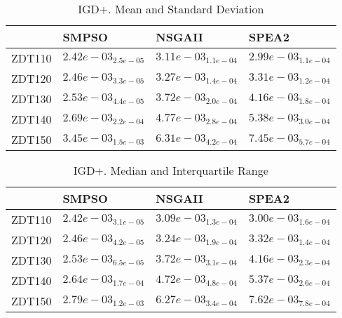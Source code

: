 \documentclass{article}
\begin{document}
\begin{table}
\caption{IGD+. Mean and Standard Deviation}
\label{table: IGD+}
\centering
\begin{scriptsize}
\begin{tabular}{llll}
\hline & SMPSO & NSGAII &  SPEA2\\
\hline 
ZDT110 & \cellcolor{gray95}$  2.42e-03_{ 2.5e-05}$ & $  3.11e-03_{ 1.1e-04}$ & \cellcolor{gray25}$  2.99e-03_{ 1.1e-04}$ \\
ZDT120 & \cellcolor{gray95}$  2.46e-03_{ 3.3e-05}$ & \cellcolor{gray25}$  3.27e-03_{ 1.4e-04}$ & $  3.31e-03_{ 1.2e-04}$ \\
ZDT130 & \cellcolor{gray95}$  2.53e-03_{ 4.4e-05}$ & \cellcolor{gray25}$  3.72e-03_{ 2.0e-04}$ & $  4.16e-03_{ 1.8e-04}$ \\
ZDT140 & \cellcolor{gray95}$  2.69e-03_{ 2.2e-04}$ & \cellcolor{gray25}$  4.77e-03_{ 2.8e-04}$ & $  5.38e-03_{ 3.0e-04}$ \\
ZDT150 & \cellcolor{gray95}$  3.45e-03_{ 1.5e-03}$ & \cellcolor{gray25}$  6.31e-03_{ 4.2e-04}$ & $  7.45e-03_{ 5.7e-04}$ \\
\hline
\end{tabular}
\end{scriptsize}
\end{table}

\begin{table}
\caption{IGD+. Median and Interquartile Range}
\label{table: IGD+}
\centering
\begin{scriptsize}
\begin{tabular}{llll}
\hline & SMPSO & NSGAII &  SPEA2\\
\hline 
ZDT110 & \cellcolor{gray95}$  2.42e-03_{ 3.1e-05}$ & $  3.09e-03_{ 1.3e-04}$ & \cellcolor{gray25}$  3.00e-03_{ 1.6e-04}$ \\
ZDT120 & \cellcolor{gray95}$  2.46e-03_{ 4.2e-05}$ & \cellcolor{gray25}$  3.24e-03_{ 1.9e-04}$ & $  3.32e-03_{ 1.4e-04}$ \\
ZDT130 & \cellcolor{gray95}$  2.53e-03_{ 6.5e-05}$ & \cellcolor{gray25}$  3.72e-03_{ 3.1e-04}$ & $  4.16e-03_{ 2.3e-04}$ \\
ZDT140 & \cellcolor{gray95}$  2.64e-03_{ 1.7e-04}$ & \cellcolor{gray25}$  4.72e-03_{ 4.8e-04}$ & $  5.37e-03_{ 2.6e-04}$ \\
ZDT150 & \cellcolor{gray95}$  2.79e-03_{ 1.2e-03}$ & \cellcolor{gray25}$  6.27e-03_{ 3.4e-04}$ & $  7.62e-03_{ 7.8e-04}$ \\
\hline
\end{tabular}
\end{scriptsize}
\end{table}
\end{document}

